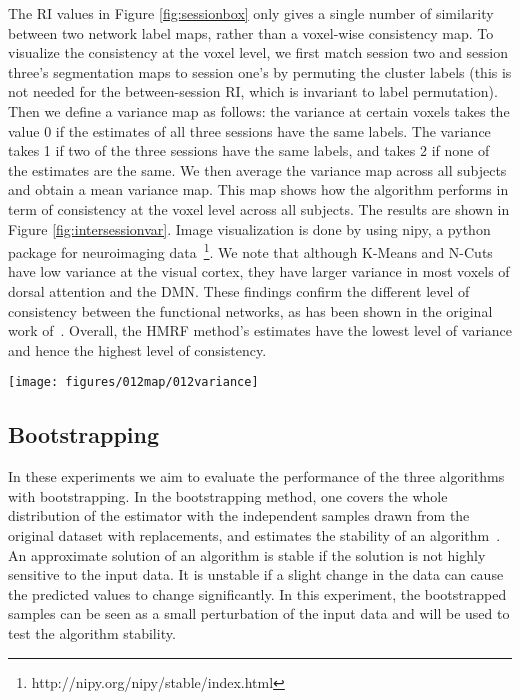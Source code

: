 \documentclass[review,authoryear]{elsarticle}
\begin{document}
The RI values in Figure \ref{fig:sessionbox} only gives a single number of
similarity between two network label maps, rather than a voxel-wise consistency
map. To visualize the consistency at the voxel level, we first match session two
and session three's segmentation maps to session one's by permuting the cluster
labels (this is not needed for the between-session RI, which is invariant to
label permutation).  Then we define a variance map as follows: the variance at
certain voxels takes the value 0 if the estimates of all three sessions have the
same labels. The variance takes 1 if two of the three sessions have the same
labels, and takes 2 if none of the estimates are the same. We then average the
variance map across all subjects and obtain a mean variance map. This map shows
how the algorithm performs in term of consistency at the voxel level across all
subjects. The results are shown in Figure \ref{fig:intersessionvar}.  Image
visualization is done by using nipy, a python package for neuroimaging
data~\footnote{http://nipy.org/nipy/stable/index.html}. We note that
although K-Means and N-Cuts have low variance at the visual cortex, they have
larger variance in most voxels of dorsal attention and the DMN. These findings
confirm the different level of consistency between the functional networks, as
has been shown in the original work of~\citet{zuo2010reliable}. Overall, the
HMRF method's estimates have the lowest level of variance and hence the highest
level of consistency.

\begin{figure*}[htb]
  \centering
  \texttt{[image: figures/012map/012variance]}
  \caption{The intersession variance maps estimated by four methods. The
    variance maps are obtained for each subject, averaged across subjects, and
    finally normalized to [0, 1]. A few voxels with intensity above 0.8 are
    rendered the same as those with intensity 0.8. This single map covers all
    seven functional networks, and we selectively show the slices corresponding
    to the three major networks. The images left are the subjects' left, and we
    use the same convention in the following figures. }
  \label{fig:intersessionvar}
\end{figure*}

\subsection{Bootstrapping}
In these experiments we aim to evaluate the performance of the three algorithms
with bootstrapping. In the bootstrapping method, one covers the whole
distribution of the estimator with the independent samples drawn from the
original dataset with replacements, and estimates the stability of an
algorithm~\citep{efron1993introduction}. An approximate solution of an algorithm
is stable if the solution is not highly sensitive to the input data. It is
unstable if a slight change in the data can cause the predicted values to change
significantly. In this experiment, the bootstrapped samples can be seen as a
small perturbation of the input data and will be used to test the algorithm
stability.
\end{document}
